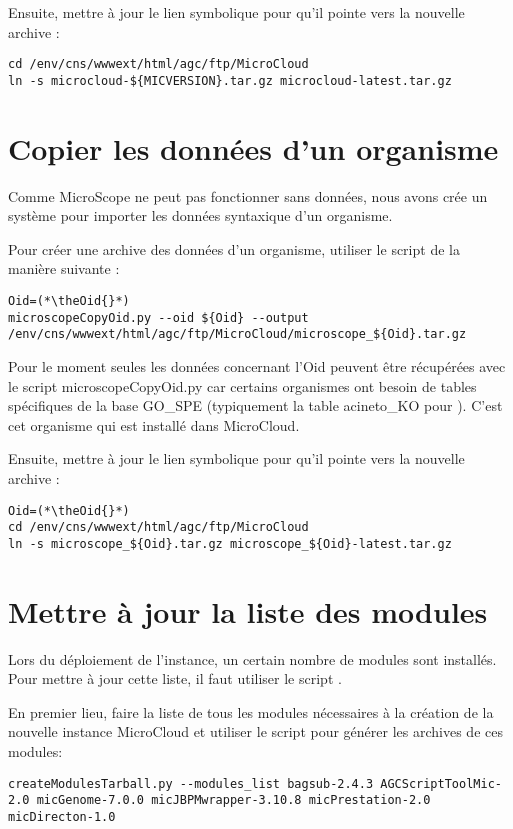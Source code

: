 Ensuite, mettre à jour le lien symbolique pour qu'il pointe vers la nouvelle archive :
\begin{lstlisting}[style=bash]
cd /env/cns/wwwext/html/agc/ftp/MicroCloud
ln -s microcloud-${MICVERSION}.tar.gz microcloud-latest.tar.gz
\end{lstlisting}

\section{Copier les données d'un organisme} \label{sec:nouvelle_donne_organisme}

Comme MicroScope ne peut pas fonctionner sans données, nous avons crée un système
pour importer les données syntaxique d'un organisme.

Pour créer une archive des données d'un organisme, utiliser le script  de la manière suivante :
\begin{lstlisting}[style=bash]
Oid=(*\theOid{}*)
microscopeCopyOid.py --oid ${Oid} --output /env/cns/wwwext/html/agc/ftp/MicroCloud/microscope_${Oid}.tar.gz
\end{lstlisting}

\begin{warningbox}
    Pour le moment seules les données concernant l'Oid \theOid{} peuvent être récupérées avec le script microscopeCopyOid.py car certains organismes ont besoin de tables spécifiques de la base GO\_SPE (typiquement la table acineto\_KO pour \theOrg{}).
    C'est cet organisme qui est installé dans MicroCloud.
\end{warningbox}

Ensuite, mettre à jour le lien symbolique pour qu'il pointe vers la nouvelle archive :
\begin{lstlisting}[style=bash]
Oid=(*\theOid{}*)
cd /env/cns/wwwext/html/agc/ftp/MicroCloud
ln -s microscope_${Oid}.tar.gz microscope_${Oid}-latest.tar.gz
\end{lstlisting}

\section{Mettre à jour la liste des modules} \label{sec:nouvelle_liste_modules}

Lors du déploiement de l'instance, un certain nombre de modules sont installés.
Pour mettre à jour cette liste, il faut utiliser le script .

En premier lieu, faire la liste de tous les modules nécessaires à la création de la nouvelle instance MicroCloud et utiliser
le script  pour générer les archives de ces modules:
\begin{lstlisting}[style=bash]
createModulesTarball.py --modules_list bagsub-2.4.3 AGCScriptToolMic-2.0 micGenome-7.0.0 micJBPMwrapper-3.10.8 micPrestation-2.0 micDirecton-1.0
\end{lstlisting}


